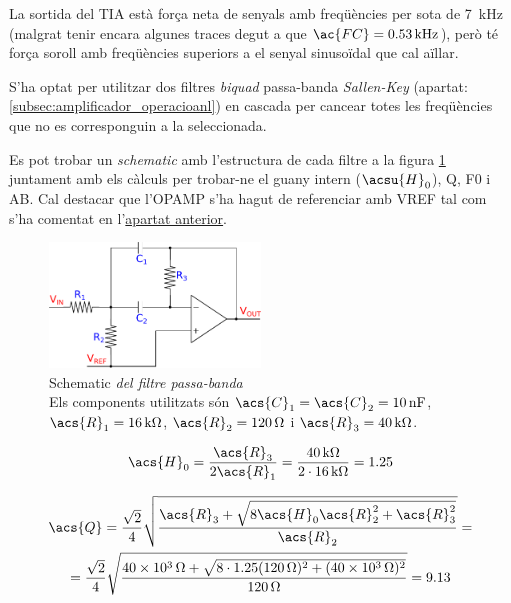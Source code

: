 La sortida del \ac{TIA} està força neta de senyals amb freqüències per sota de \SI{7}{\kilo\hertz} (malgrat tenir encara algunes traces degut a que $ \ac{FC} = \SI{0.53}{\kilo\hertz} $), però té força soroll amb freqüències superiors a el senyal sinusoïdal que cal aïllar.

S'ha optat per utilitzar dos filtres \textit{biquad} passa-banda \textit{Sallen-Key} (apartat: \ref{subsec:amplificador_operacioanl}) en cascada per cance\lgem ar totes les freqüències que no es corresponguin a la seleccionada.

Es pot trobar un \textit{schematic} amb l'estructura de cada filtre a la figura \ref{fig:schematic_filtre_p-banda} juntament amb els càlculs per trobar-ne el guany intern ($ \acsu{H}_0 $), \ac{Q}, \ac{F0} i \ac{AB}. Cal destacar que l'\ac{OPAMP} s'ha hagut de referenciar amb \ac{VREF} tal com s'ha comentat en l'\hyperref[itm:vref]{apartat anterior}.

\begin{figure}[htp]
	\centering
	\includegraphics[width=0.5\textwidth]{Figures/schematic_filtre_p-banda.pdf}
	\caption[Filtre passa-banda]{Schematic\textit{ del filtre passa-banda}\\{\footnotesize Els components utilitzats són $ \acs{C}_1 = \acs{C}_2=\SI{10}{\nano\farad} $, $ \acs{R}_1 = \SI{16}{\kilo\ohm} $, $ \acs{R}_2 = \SI{120}{\ohm} $ i $ \acs{R}_3=\SI{40}{\kilo\ohm} $.}}
	\label{fig:schematic_filtre_p-banda}
\end{figure}

\begin{equation}
\acs{H}_0 = \frac{\acs{R}_3}{2\acs{R}_1} = \frac{\SI{40}{\kilo\ohm}}{2\cdot\SI{16}{\kilo\ohm}} = \num{1.25}
\end{equation}

\begin{multline}
\acs{Q} = \frac{\sqrt{\num{2}}}{\num{4}}\sqrt{\frac{\acs{R}_3+\sqrt{8\acs{H}_0\acs{R}_2^2+\acs{R}_3^2}}{\acs{R}_2}} =\\= \frac{\sqrt{\num{2}}}{\num{4}}\sqrt{\frac{\SI{40e3}{\ohm}+\sqrt{8\cdot\num{1.25}(\SI{120}{\ohm})^2+(\SI{40e3}{\ohm})^2}}{\SI{120}{\ohm}}} = \num{9.13}
\end{multline}


